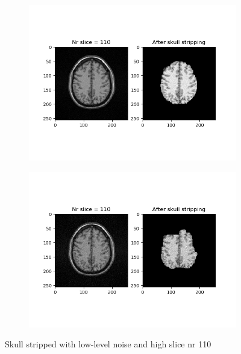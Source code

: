 \begin{figure}[H]
	\centering
	\begin{subfigure}[b]{0.35\linewidth}
		\includegraphics[scale=0.35]{figures/Module_08/M8_12.png}
	\end{subfigure}
		\begin{subfigure}[b]{0.35\linewidth}
		\includegraphics[scale=0.35]{figures/Module_08/M8_n12.png}
	\end{subfigure}
	\caption{Skull stripped with low-level noise and high slice nr 110}
	\label{fig:figures/m08_12}
\end{figure}

